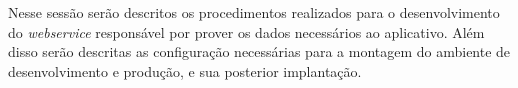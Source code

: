
	\par Nesse sessão serão descritos os procedimentos realizados para o
desenvolvimento do \textit{webservice} responsável por prover os dados
necessários ao aplicativo. Além disso serão descritas as configuração
necessárias para a montagem do ambiente de desenvolvimento e produção, e sua
posterior implantação.